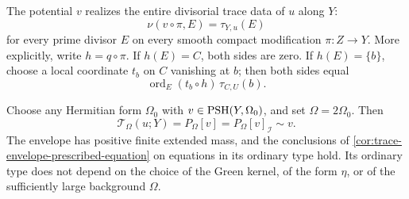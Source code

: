 \begin{theorem}\label{thm:curve-fibration-exact-trace}
The potential $v$ realizes the entire divisorial trace data of $u$ along $Y$:
\[
 \nu(v\circ\pi,E)=\tau_{Y,u}(E)
\]
for every prime divisor $E$ on every smooth compact modification $\pi\colon Z\to Y$. More explicitly, write $h=q\circ\pi$. If $h(E)=C$, both sides are zero. If $h(E)=\{b\}$, choose a local coordinate $t_b$ on $C$ vanishing at $b$; then both sides equal
\[
 \operatorname{ord}_E(t_b\circ h)\,\tau_{C,U}(b).
\]

Choose any Hermitian form $\Omega_0$ with $v\in\mathrm{PSH}(Y,\Omega_0)$, and set $\Omega=2\Omega_0$. Then
\begin{equation}\label{eq:curve-fibration-trace-envelope}
 \mathcal T_\Omega(u;Y)=P_\Omega[v]=P_\Omega[v]_{\mathcal I}\sim v.
\end{equation}
The envelope has positive finite extended mass, and the conclusions of \cref{cor:trace-envelope-prescribed-equation} on equations in its ordinary type hold. Its ordinary type does not depend on the choice of the Green kernel, of the form $\eta$, or of the sufficiently large background $\Omega$.
\end{theorem}
